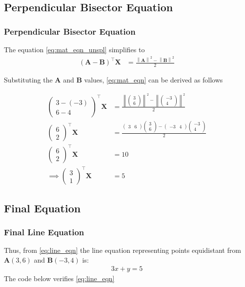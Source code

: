 \documentclass{beamer}
\providecommand{\brak}[1]{\ensuremath{\left(#1\right)}}
\theoremstyle{remark}
\providecommand{\norm}[1]{\left\lVert#1\right\rVert}
\newcommand{\myvec}[1]{\ensuremath{\begin{pmatrix}#1\end{pmatrix}}}
\let\vec\mathbf
\numberwithin{equation}{section}
\begin{document}
\subsection{Perpendicular Bisector Equation}
\begin{frame}
\frametitle{Perpendicular Bisector Equation}

The equation \eqref{eq:mat_eqn_unspl} simplifies to
\begin{align}
    \label{eq:mat_eqn}
	\brak{\vec{A} - \vec{B}}^\top \vec{X} &= \frac{\norm{\vec{A}}^2 - \norm{\vec{B}}^2}{2}
\end{align}

Substituting the $\vec{A}$ and $\vec{B}$ values, \eqref{eq:mat_eqn} can be derived as follows

\begin{align}
    \myvec{3-(-3) \\ 6-4}^\top \vec{X} &= \frac{\norm{\myvec{3 \\ 6}}^2-\norm{\myvec{-3 \\ 4}}^2}{2} \\
    \myvec{6 \\ 2}^\top \vec{X} &= \frac{\myvec{3 & 6}\myvec{3 \\ 6} - \myvec{-3 & 4}\myvec{-3 \\ 4}}{2} \\
    \myvec{6 \\ 2}^\top \vec{X} &= 10 \\
    \label{eq:line_eqn} \implies \myvec{3 \\ 1}^\top \vec{X} &= 5
\end{align}
\end{frame}

\subsection{Final Equation}
\begin{frame}
\frametitle{Final Line Equation}
Thus, from \eqref{eq:line_eqn} the line equation representing points equidistant from $\vec{A}(3, 6)$ and $\vec{B}(-3, 4)$ is:
\begin{align}
	3x + y = 5
\end{align}
The code below verifies \eqref{eq:line_eqn}
\end{frame}

\end{document}
